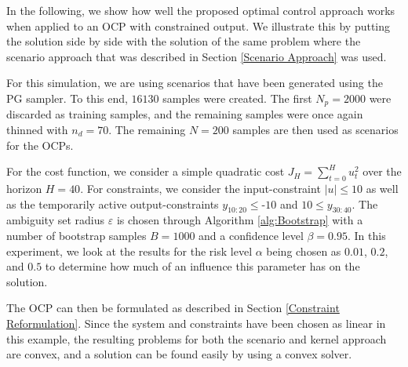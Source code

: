 In the following, we show how well the proposed optimal control approach works when applied to an OCP with constrained output. We illustrate this by putting the solution side by side with the solution of the same problem where the scenario approach that was described in Section \ref{Scenario Approach} was used. 

For this simulation, we are using scenarios that have been generated using the PG sampler. To this end, $16130$ samples were created. The first $N_p = 2000$ were discarded as training samples, and the remaining samples were once again thinned with $n_d = 70$. The remaining $N = 200$ samples are then used as scenarios for the OCPs.

For the cost function, we consider a simple quadratic cost $J_H = \sum_{t = 0}^H u_t^2$ over the horizon $H = 40$. For constraints, we consider the input-constraint $\left| u \right| \leq 10$ as well as the temporarily active output-constraints $y_{10:20} \leq \text{-} 10$ and $10 \leq y_{30:40}$.  The ambiguity set radius $\varepsilon$ is chosen through Algorithm \ref{alg:Bootstrap} with a number of bootstrap samples $B = 1000$ and a confidence level $\beta = 0.95$. In this experiment, we look at the results for the risk level $\alpha$ being chosen as $0.01$, $0.2$, and $0.5$ to determine how much of an influence this parameter has on the solution.

The OCP can then be formulated as described in Section \ref{Constraint Reformulation}. Since the system and constraints have been chosen as linear in this example, the resulting problems for both the scenario and kernel approach are convex, and a solution can be found easily by using a convex solver.

